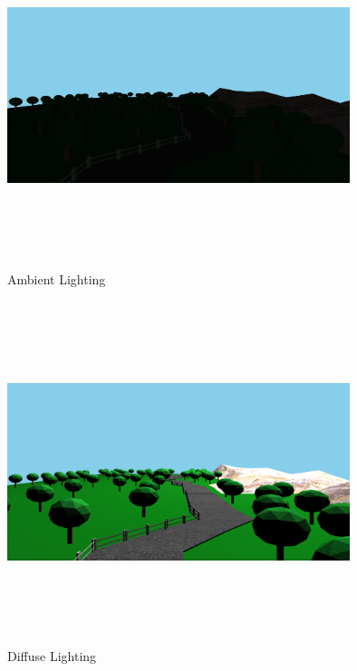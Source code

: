 \documentclass{report}
\begin{document}
    \medskip
    \begin{figure}[h!]
      \centering
        \includegraphics[width=10cm,height=10cm,keepaspectratio]{ambient.png}
        \caption{Ambient Lighting}
    \end{figure}

    \medskip
    \begin{figure}[h!]
      \centering
        \includegraphics[width=10cm,height=10cm,keepaspectratio]{diffuse.png}
        \caption{Diffuse Lighting}
    \end{figure}
\end{document}
